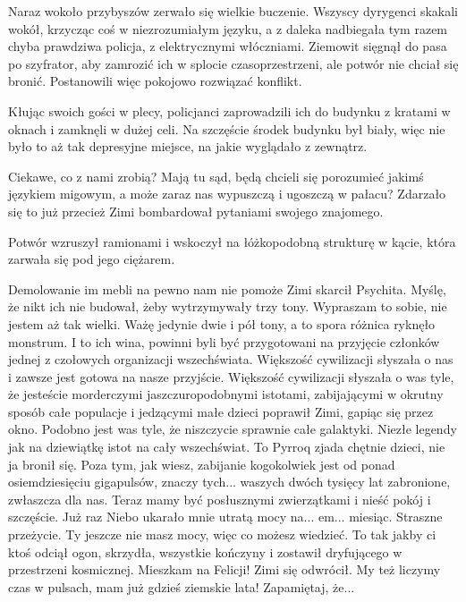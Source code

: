 Naraz wokoło przybyszów zerwało się wielkie buczenie.
Wszyscy dyrygenci skakali wokół, krzycząc coś w niezrozumiałym języku, a z daleka nadbiegała tym razem chyba prawdziwa policja, z elektrycznymi włóczniami.
Ziemowit sięgnął do pasa po szyfrator, aby zamrozić ich w splocie czasoprzestrzeni, ale potwór nie chciał się bronić.
Postanowili więc pokojowo rozwiązać konflikt.

Kłując swoich gości w plecy, policjanci zaprowadzili ich do budynku z kratami w oknach i zamknęli w dużej celi.
Na szczęście środek budynku był biały, więc nie było to aż tak depresyjne miejsce, na jakie wyglądało z zewnątrz.

\begin{dialogue}
\ds{} Ciekawe, co z nami zrobią? Mają tu sąd, będą chcieli się porozumieć jakimś językiem migowym, a może zaraz nas wypuszczą i ugoszczą w pałacu? Zdarzało się to już przecież
\dm{} Zimi bombardował pytaniami swojego znajomego.
\end{dialogue}

Potwór wzruszył ramionami i wskoczył na łóżkopodobną strukturę w kącie, która zarwała się pod jego ciężarem.

\begin{dialogue}
\ds{} Demolowanie im mebli na pewno nam nie pomoże \dm{} Zimi skarcił Psychita. \dm{} Myślę, że nikt ich nie budował, żeby wytrzymywały trzy tony.
\ds{} Wypraszam to sobie, nie jestem aż tak wielki. Ważę jedynie dwie i pół tony, a to spora różnica \dm{} ryknęło monstrum. \dm{}
I to ich wina, powinni byli być przygotowani na przyjęcie członków jednej z czołowych organizacji wszechświata. 
Większość cywilizacji słyszała o nas i zawsze jest gotowa na nasze przyjście.
\ds{} Większość cywilizacji słyszała o was tyle, że jesteście morderczymi jaszczuropodobnymi istotami, zabijającymi w okrutny sposób całe populacje i jedzącymi małe dzieci \dm{}
poprawił Zimi, gapiąc się przez okno. \dm{} Podobno jest was tyle, że niszczycie sprawnie całe galaktyki. Niezłe legendy jak na dziewiątkę istot na cały wszechświat.
\ds{} To Pyrroq zjada chętnie dzieci, nie ja \dm{} bronił się. \dm{} Poza tym, jak wiesz, zabijanie kogokolwiek jest od ponad osiemdziesięciu gigapulsów, 
znaczy tych... waszych dwóch tysięcy lat zabronione, zwłaszcza dla nas.
Teraz mamy być posłusznymi zwierzątkami i nieść pokój i szczęście. Już raz Niebo ukarało mnie utratą mocy na... em... miesiąc. Straszne przeżycie.
Ty jeszcze nie masz mocy, więc co możesz wiedzieć. To tak jakby ci ktoś odciął ogon, skrzydła, wszystkie kończyny i zostawił dryfującego w przestrzeni kosmicznej.
\ds{} Mieszkam na Felicji! \dm{} Zimi się odwrócił. \dm{} My też liczymy czas w pulsach, mam już gdzieś ziemskie lata! Zapamiętaj, że...
\end{dialogue}

